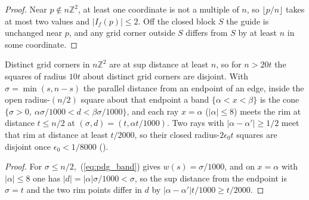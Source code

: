 \begin{proof}\leanok
    Near $p\notin n\mathbb Z^2$, at least one coordinate is not a multiple of $n$,
    so $\lfloor p/n\rfloor$ takes at most two values and $|I_f(p)|\le2$. Off the
    closed block $S$ the guide is unchanged near $p$, and any grid corner outside
    $S$ differs from $S$ by at least $n$ in some coordinate.
\end{proof}

\begin{lemma}
    \label{lem:peps_dyadic_choice_K0}
    \leanok
    Distinct grid corners in $n\mathbb Z^2$ are at sup distance at least $n$, so
    for $n>20t$ the squares of radius $10t$ about distinct grid corners are
    disjoint. With $\sigma=\min(s,n-s)$ the parallel distance from an endpoint of
    an edge, inside the open radius-$(n/2)$ square about that endpoint a band
    $\{\alpha<x<\beta\}$ is the cone
    $\{\sigma>0,\ \alpha\sigma/1000<d<\beta\sigma/1000\}$, and each ray $x=\alpha$
    ($|\alpha|\le8$) meets the rim at distance $t\le n/2$ at $(\sigma,d)=(t,\alpha t/1000)$.
    Two rays with $|\alpha-\alpha'|\ge1/2$ meet that rim at distance at least
    $t/2000$, so their closed radius-$2\epsilon_0t$ squares are disjoint once
    $\epsilon_0<1/8000$ (\cite[Section~7, lines 341--351]{OpenAI2026PolynomialPEPS}).
\end{lemma}

\begin{proof}\leanok
    For $\sigma\le n/2$,~(\ref{eq:pdg_band}) gives $w(s)=\sigma/1000$, and on
    $x=\alpha$ with $|\alpha|\le8$ one has $|d|=|\alpha|\sigma/1000<\sigma$, so the
    sup distance from the endpoint is $\sigma=t$ and the two rim points differ in
    $d$ by $|\alpha-\alpha'|t/1000\ge t/2000$.
\end{proof}

